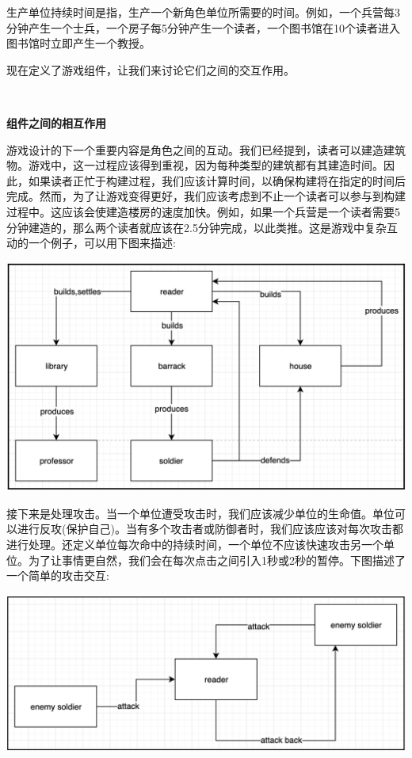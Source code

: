 生产单位持续时间是指，生产一个新角色单位所需要的时间。例如，一个兵营每3分钟产生一个士兵，一个房子每5分钟产生一个读者，一个图书馆在10个读者进入图书馆时立即产生一个教授。 \par
现在定义了游戏组件，让我们来讨论它们之间的交互作用。 \par

\noindent\textbf{}\ \par
\textbf{组件之间的相互作用} \ \par
游戏设计的下一个重要内容是角色之间的互动。我们已经提到，读者可以建造建筑物。游戏中，这一过程应该得到重视，因为每种类型的建筑都有其建造时间。因此，如果读者正忙于构建过程，我们应该计算时间，以确保构建将在指定的时间后完成。然而，为了让游戏变得更好，我们应该考虑到不止一个读者可以参与到构建过程中。这应该会使建造楼房的速度加快。例如，如果一个兵营是一个读者需要5分钟建造的，那么两个读者就应该在2.5分钟完成，以此类推。这是游戏中复杂互动的一个例子，可以用下图来描述: \par

\begin{center}
	\includegraphics[width=1.0\textwidth]{content/Section-2/Chapter-11/1}
\end{center}

接下来是处理攻击。当一个单位遭受攻击时，我们应该减少单位的生命值。单位可以进行反攻(保护自己)。当有多个攻击者或防御者时，我们应该应该对每次攻击都进行处理。还定义单位每次命中的持续时间，一个单位不应该快速攻击另一个单位。为了让事情更自然，我们会在每次点击之间引入1秒或2秒的暂停。下图描述了一个简单的攻击交互: \par

\begin{center}
	\includegraphics[width=1.0\textwidth]{content/Section-2/Chapter-11/2}
\end{center}

